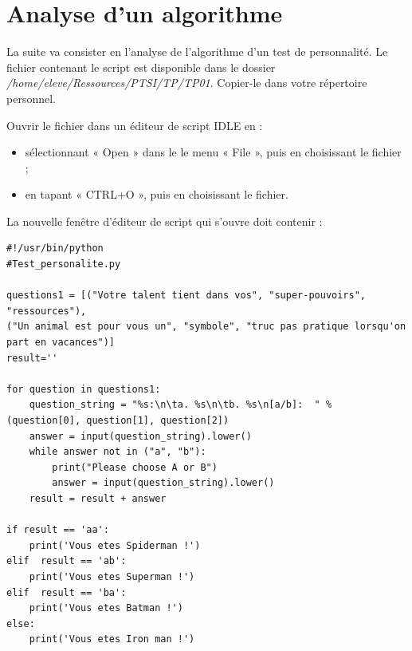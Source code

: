 \section{Analyse d'un algorithme}

La suite va consister en l'analyse de l'algorithme d'un test de personnalité. Le fichier contenant le script est disponible dans le dossier \textit{/home/eleve/Ressources/PTSI/TP/TP01}. Copier-le dans votre répertoire personnel.

Ouvrir le fichier dans un éditeur de script IDLE en :
\begin{itemize}
 \item sélectionnant « Open » dans le le menu « File », puis en choisissant le fichier ;
 \item en tapant « CTRL+O », puis en choisissant le fichier.
\end{itemize}

La nouvelle fenêtre d'éditeur de script qui s'ouvre doit contenir :

\begin{verbatim}
#!/usr/bin/python 
#Test_personalite.py 
 
questions1 = [("Votre talent tient dans vos", "super-pouvoirs", "ressources"), 
("Un animal est pour vous un", "symbole", "truc pas pratique lorsqu'on part en vacances")] 
result='' 
 
for question in questions1: 
    question_string = "%s:\n\ta. %s\n\tb. %s\n[a/b]:  " % (question[0], question[1], question[2]) 
    answer = input(question_string).lower() 
    while answer not in ("a", "b"): 
        print("Please choose A or B") 
        answer = input(question_string).lower() 
    result = result + answer 
 
if result == 'aa': 
    print('Vous etes Spiderman !')
elif  result == 'ab': 
    print('Vous etes Superman !')
elif  result == 'ba': 
    print('Vous etes Batman !')
else: 
    print('Vous etes Iron man !')
\end{verbatim}

